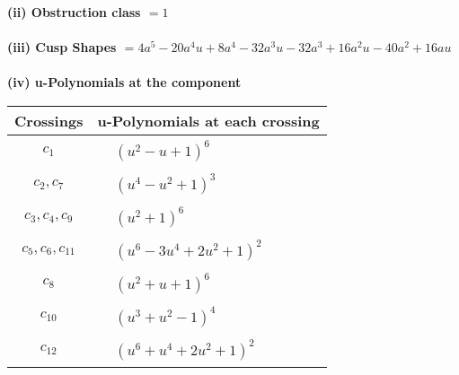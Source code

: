 \documentclass[1p]{elsarticle_modified}
\theoremstyle{definition}
\begin{document}
\flushleft \textbf{(ii) Obstruction class $= 1$}\\~\\
\flushleft \textbf{(iii) Cusp Shapes $= 4 a^5-20 a^4 u+8 a^4-32 a^3 u-32 a^3+16 a^2 u-40 a^2+16 a u$}\\~\\
\newpage\renewcommand{\arraystretch}{1}
\flushleft \textbf{(iv) u-Polynomials at the component}\newline \\
\begin{tabular}{m{50pt}|m{274pt}}
Crossings & \hspace{64pt}u-Polynomials at each crossing \\
\hline $$\begin{aligned}c_{1}\end{aligned}$$&$\begin{aligned}
&(u^2- u+1)^6
\end{aligned}$\\
\hline $$\begin{aligned}c_{2},c_{7}\end{aligned}$$&$\begin{aligned}
&(u^4- u^2+1)^3
\end{aligned}$\\
\hline $$\begin{aligned}c_{3},c_{4},c_{9}\end{aligned}$$&$\begin{aligned}
&(u^2+1)^6
\end{aligned}$\\
\hline $$\begin{aligned}c_{5},c_{6},c_{11}\end{aligned}$$&$\begin{aligned}
&(u^6-3 u^4+2 u^2+1)^2
\end{aligned}$\\
\hline $$\begin{aligned}c_{8}\end{aligned}$$&$\begin{aligned}
&(u^2+u+1)^6
\end{aligned}$\\
\hline $$\begin{aligned}c_{10}\end{aligned}$$&$\begin{aligned}
&(u^3+u^2-1)^4
\end{aligned}$\\
\hline $$\begin{aligned}c_{12}\end{aligned}$$&$\begin{aligned}
&(u^6+u^4+2 u^2+1)^2
\end{aligned}$\\
\hline
\end{tabular}\\~\\
\end{document}
